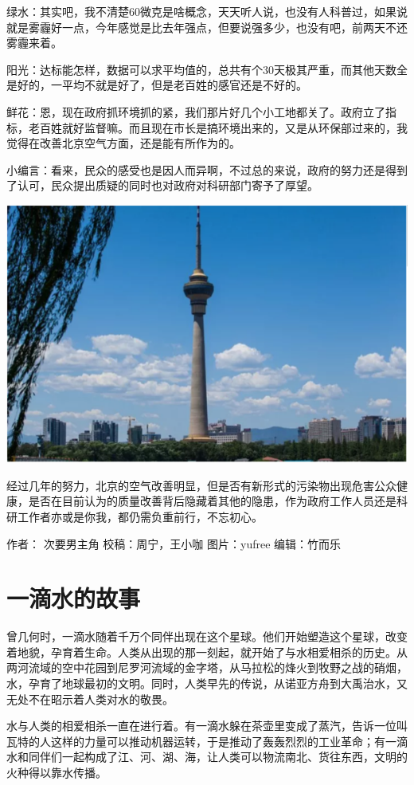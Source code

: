 \documentclass[]{book}
\begin{document}
绿水：其实吧，我不清楚60微克是啥概念，天天听人说，也没有人科普过，如果说就是雾霾好一点，今年感觉是比去年强点，但要说强多少，也没有吧，前两天不还雾霾来着。

阳光：达标能怎样，数据可以求平均值的，总共有个30天极其严重，而其他天数全是好的，一平均不就是好了，但是老百姓的感官还是不好的。

鲜花：恩，现在政府抓环境抓的紧，我们那片好几个小工地都关了。政府立了指标，老百姓就好监督嘛。而且现在市长是搞环境出来的，又是从环保部过来的，我觉得在改善北京空气方面，还是能有所作为的。

小编言：看来，民众的感受也是因人而异啊，不过总的来说，政府的努力还是得到了认可，民众提出质疑的同时也对政府对科研部门寄予了厚望。

\includegraphics[width=8.33in]{images/air5}

经过几年的努力，北京的空气改善明显，但是否有新形式的污染物出现危害公众健康，是否在目前认为的质量改善背后隐藏着其他的隐患，作为政府工作人员还是科研工作者亦或是你我，都仍需负重前行，不忘初心。

作者： 次要男主角 校稿：周宁，王小咖 图片：yufree 编辑：竹而乐

\section{一滴水的故事}

曾几何时，一滴水随着千万个同伴出现在这个星球。他们开始塑造这个星球，改变着地貌，孕育着生命。人类从出现的那一刻起，就开始了与水相爱相杀的历史。从两河流域的空中花园到尼罗河流域的金字塔，从马拉松的烽火到牧野之战的硝烟，水，孕育了地球最初的文明。同时，人类早先的传说，从诺亚方舟到大禹治水，又无处不在昭示着人类对水的敬畏。

水与人类的相爱相杀一直在进行着。有一滴水躲在茶壶里变成了蒸汽，告诉一位叫瓦特的人这样的力量可以推动机器运转，于是推动了轰轰烈烈的工业革命；有一滴水和同伴们一起构成了江、河、湖、海，让人类可以物流南北、货往东西，文明的火种得以靠水传播。
\end{document}

